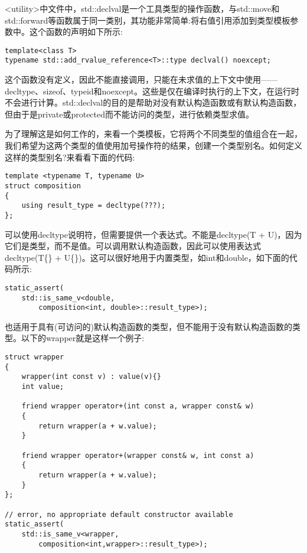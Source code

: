<utility>中文件中，std::declval是一个工具类型的操作函数，与std::move和std::forward等函数属于同一类别，其功能非常简单:将右值引用添加到类型模板参数中。这个函数的声明如下所示:

\begin{lstlisting}[style=styleCXX]
template<class T>
typename std::add_rvalue_reference<T>::type declval() noexcept;
\end{lstlisting}

这个函数没有定义，因此不能直接调用，只能在未求值的上下文中使用——decltype、sizeof、typeid和noexcept。这些是仅在编译时执行的上下文，在运行时不会进行计算。std::declval的目的是帮助对没有默认构造函数或有默认构造函数，但由于是private或protected而不能访问的类型，进行依赖类型求值。

为了理解这是如何工作的，来看一个类模板，它将两个不同类型的值组合在一起，我们希望为这两个类型的值使用加号操作符的结果，创建一个类型别名。如何定义这样的类型别名?来看看下面的代码:

\begin{lstlisting}[style=styleCXX]
template <typename T, typename U>
struct composition
{
	using result_type = decltype(???);
};
\end{lstlisting}

可以使用decltype说明符，但需要提供一个表达式。不能是decltype(T + U)，因为它们是类型，而不是值。可以调用默认构造函数，因此可以使用表达式decltype(T\{\} + U\{\})。这可以很好地用于内置类型，如int和double，如下面的代码所示:

\begin{lstlisting}[style=styleCXX]
static_assert(
	std::is_same_v<double,
		composition<int, double>::result_type>);
\end{lstlisting}

也适用于具有(可访问的)默认构造函数的类型，但不能用于没有默认构造函数的类型。以下的wrapper就是这样一个例子:

\begin{lstlisting}[style=styleCXX]
struct wrapper
{
	wrapper(int const v) : value(v){}
	int value;
	
	friend wrapper operator+(int const a, wrapper const& w)
	{
		return wrapper(a + w.value);
	}

	friend wrapper operator+(wrapper const& w, int const a)
	{
		return wrapper(a + w.value);
	}
};

// error, no appropriate default constructor available
static_assert(
	std::is_same_v<wrapper,
		composition<int,wrapper>::result_type>);
\end{lstlisting}

